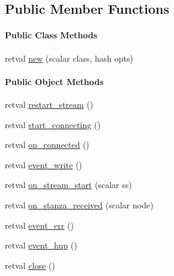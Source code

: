 \subsection*{\-Public \-Member \-Functions}
\begin{Indent}\paragraph*{\-Public \-Class \-Methods}
\begin{DoxyCompactItemize}
\item 
retval \hyperlink{class_d_jabberd_1_1_connection_1_1_client_out_ab3e914f1f26e24c3e13639a61904af46}{new} (scalar class, hash opts)
\end{DoxyCompactItemize}
\end{Indent}
\begin{Indent}\paragraph*{\-Public \-Object \-Methods}
\begin{DoxyCompactItemize}
\item 
retval \hyperlink{class_d_jabberd_1_1_connection_1_1_client_out_a0658ff79c96ce74eb311963cf21be7f9}{restart\-\_\-stream} ()
\item 
retval \hyperlink{class_d_jabberd_1_1_connection_1_1_client_out_abfc1812bd58bc72b7c54b787f8d95948}{start\-\_\-connecting} ()
\item 
retval \hyperlink{class_d_jabberd_1_1_connection_1_1_client_out_a86c86548423c0fada33973b5e73b9edc}{on\-\_\-connected} ()
\item 
retval \hyperlink{class_d_jabberd_1_1_connection_1_1_client_out_a755aed2cff949bfd9f4fb9c28e87fea0}{event\-\_\-write} ()
\item 
retval \hyperlink{class_d_jabberd_1_1_connection_1_1_client_out_a9a53b1e335fa929e6c505c1364e06723}{on\-\_\-stream\-\_\-start} (scalar ss)
\item 
retval \hyperlink{class_d_jabberd_1_1_connection_1_1_client_out_a0458c9ae427b63840d6220f178631bc8}{on\-\_\-stanza\-\_\-received} (scalar node)
\item 
retval \hyperlink{class_d_jabberd_1_1_connection_1_1_client_out_a8f56a7142e4cddabb01d281bfab7506f}{event\-\_\-err} ()
\item 
retval \hyperlink{class_d_jabberd_1_1_connection_1_1_client_out_a97cdf44a50aaddeb0b998d835acd3377}{event\-\_\-hup} ()
\item 
retval \hyperlink{class_d_jabberd_1_1_connection_1_1_client_out_af34e4d1557ea1071210432a2e4ef3871}{close} ()
\end{DoxyCompactItemize}
\end{Indent}


